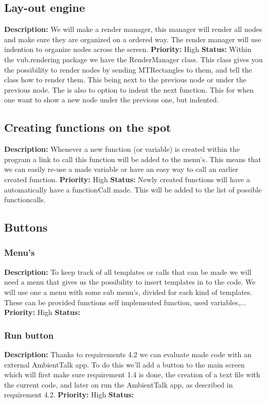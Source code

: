 \documentclass[a4paper,12pt]{report}
\begin{document}
\subsection{Lay-out engine}
\textbf{Description: } We will make a render manager, this manager will render all nodes and make sure they are organized on a ordered way. The render manager will use
indention to organize nodes across the screen.
\textbf{Priority:} High \newline
\textbf{Status: } Within the vub.rendering package we have the RenderManager class. This class gives you the possibility to render nodes
by sending MTRectangles to them, and tell the class how to render them. This being next to the previous node or under the previous node. 
The is also to option to indent the next function. This for when one want to show a new node under the previous one, but indented. \newline
\subsection{Creating functions on the spot}
\textbf{Description: } Whenever a new function (or variable) is created within the program a link to call this function will be added to the menu's. This means that we can
easily re-use a made variable or have an easy way to call an earlier created function. \newline
\textbf{Priority:} High \newline
\textbf{Status: } Newly created functions will have a automatically have a functionCall made. This will be added to the list of possible
functioncalls.\newline
\subsection{Buttons}
\subsubsection{Menu's}
\textbf{Description: } To keep track of all templates or calls that can be made we will need a menu that gives us the possibility to insert templates in to the code.
We will use one a menu with some sub menu's, divided for each kind of templates. These can be provided functions self implemented function, used variables,... \newline
\textbf{Priority:} High \newline
\textbf{Status: } \newline
\subsubsection{Run button}
\textbf{Description: } Thanks to requirements 4.2 we can evaluate made code with an external AmbientTalk app. To do this we'll add a button
to the main screen which will first make sure requirement 1.4 is done, the creation of a text file with the current code, and later on run the AmbientTalk app, as described in requirement 4.2.
\textbf{Priority:} High \newline
\textbf{Status: } \newline
\end{document}
